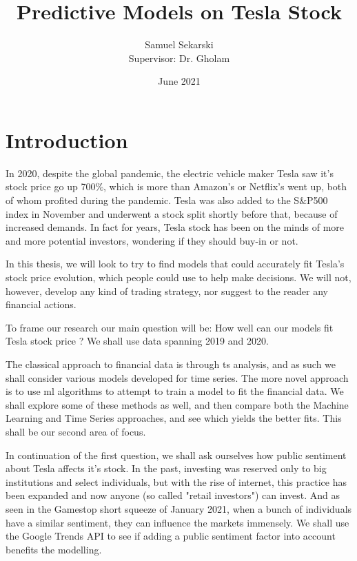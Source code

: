 \documentclass[10pt]{report}
\title{Predictive Models on Tesla Stock}
\author{Samuel Sekarski \\ Supervisor: Dr. Gholam}
\date{June 2021}
\begin{document}
 
\maketitle

\tableofcontents
\listoffigures

\chapter{Introduction}
In 2020, despite the global pandemic, the electric vehicle maker Tesla saw it's stock price go up 700$\%$, which is more than Amazon's or Netflix's went up, both of whom profited during the pandemic. Tesla was also added to the S$\&$P500 index in November and underwent a stock split shortly before that, because of increased demands. In fact for years, Tesla stock has been on the minds of more and more potential investors, wondering if they should buy-in or not.

In this thesis, we will look to try to find models that could accurately fit Tesla's stock price evolution, which people could use to help make decisions. We will not, however, develop any kind of trading strategy, nor suggest to the reader any financial actions.

To frame our research our main question will be: How well can our models fit Tesla stock price ?
We shall use data spanning 2019 and 2020.

The classical approach to financial data is through \acrfull{ts} analysis, and as such we shall consider various models developed for time series. The more novel approach is to use \acrfull{ml} algorithms to attempt to train a model to fit the financial data. We shall explore some of these methods as well, and then compare both the Machine Learning and Time Series approaches, and see which yields the better fits. This shall be our second area of focus.

In continuation of the first question, we shall ask ourselves how public sentiment about Tesla affects it's stock. In the past, investing was reserved only to big institutions and select individuals, but with the rise of internet, this practice has been expanded and now anyone (so called "retail investors") can invest. And as seen in the Gamestop short squeeze of January 2021, when a bunch of individuals have a similar sentiment, they can influence the markets immensely. We shall use the Google Trends API to see if adding a public sentiment factor into account benefits the modelling.
\end{document}
